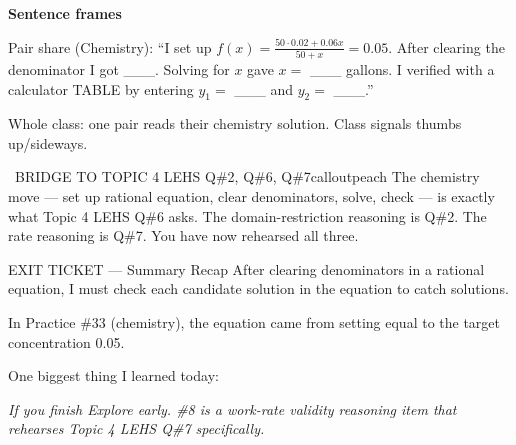\documentclass[11pt]{article}
\begin{document}

\begin{sentenceframebox}
\textbf{Sentence frames}

Pair share (Chemistry): ``I set up \(f(x) = \frac{50\cdot0.02 + 0.06x}{50+x} = 0.05\). After clearing the denominator I got \_\_\_. Solving for \(x\) gave \(x =\) \_\_\_ gallons. I verified with a calculator TABLE by entering \(y_1 =\) \_\_\_ and \(y_2 =\) \_\_\_.''

Whole class: one pair reads their chemistry solution. Class signals thumbs up/sideways.
\end{sentenceframebox}

\begin{callout}{\IconSearch\ BRIDGE TO TOPIC 4 LEHS Q\#2, Q\#6, Q\#7}{calloutpeach}
The chemistry move --- set up rational equation, clear denominators, solve, check --- is exactly what Topic 4 LEHS Q\#6 asks. The domain-restriction reasoning is Q\#2. The rate reasoning is Q\#7. You have now rehearsed all three.
\end{callout}


\begin{summaryexitbox}{EXIT TICKET --- Summary Recap}
After clearing denominators in a rational equation, I must check each candidate solution in the \blank[1.1in] equation to catch \blank[1.0in] solutions.

In Practice \#33 (chemistry), the equation came from setting \blank[2.2in] equal to the target concentration 0.05.

One biggest thing I learned today: \dotfill
\end{summaryexitbox}

\clearpage

\textit{If you finish Explore early. \#8 is a work-rate validity reasoning item that rehearses Topic 4 LEHS Q\#7 specifically.}

\end{document}

